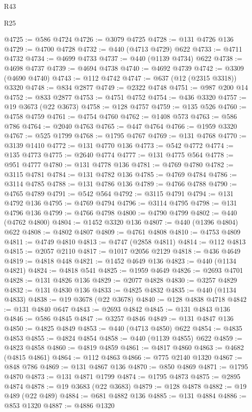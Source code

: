 \begin{lexlean}{R43}
\begin{lexlean}{R25}
\begin{coremodule}
{{{{{{{{{{{{{{{{{{{{{{{{{{{{{{{{{{{{{{{{{{{{{{{{{{{{{{{{{{{{{{{{{{{{{{{{{{{{{{{{{{{{{{{{{{{{{{{{{{{{{{{{{{{{{{{{{{{{{{{{{{{{{{{{{{{{{{{{{{{{{{{{{{{{{{{{{{{{{{{{{{{{{{{{{{{{{{{{{{{{{{{{{{{{{{{{{@4725 := @586 @4724
@4726 := @3079 @4725
@4728 := @131 @4726 @136
@4729 := @4700 @4728
@4732 := @440 (@4713 @4729) @622
@4733 := @4711 @4732
@4734 := @4699 @4733
@4737 := @440 (@1139 @4734) @622
@4738 := @4698 @4737
@4739 := @4694 @4738
@4740 := @4692 @4739
@4742 := @3309 (@4690 @4740)
@4743 := @112 @4742
@4747 := @637 (@12 (@2315 @3318)) @3320
@4748 := @834 @2877
@4749 := @2322 @4748
@4751 := @987 @200 @14
@4752 := @833 @2877
@4753 := @4751 @4752
@4754 := @436 @3320
@4757 := @19 @3673 (@22 @3673)
@4758 := @128 @4757
@4759 := @135 @526
@4760 := @4758 @4759
@4761 := @4754 @4760
@4762 := @1408 @573
@4763 := @586 @786
@4764 := @2040 @4763
@4765 := @447 @4764
@4766 := @1959 @3320
@4767 := @525 @1799
@4768 := @1795 @4767
@4769 := @131 @4768
@4770 := @3139 @1410
@4772 := @131 @4770 @136
@4773 := @542 @4772
@4774 := @135 @4773
@4775 := @2640 @4774
@4777 := @131 @4775 @564
@4778 := @951 @4777
@4780 := @131 @4778 @136
@4781 := @4769 @4780
@4782 := @3115 @4781
@4784 := @131 @4782 @136
@4785 := @4769 @4784
@4786 := @3114 @4785
@4788 := @131 @4786 @136
@4789 := @4766 @4788
@4790 := @4765 @4789
@4791 := @542 @564
@4792 := @3115 @4791
@4794 := @131 @4792 @136
@4795 := @4769 @4794
@4796 := @3114 @4795
@4798 := @131 @4796 @136
@4799 := @4766 @4798
@4800 := @4790 @4799
@4802 := @440 (@4762 @4800)
@4804 := @1452 @3320 @136
@4807 := @440 (@1396 @4804) @622
@4808 := @4802 @4807
@4809 := @4761 @4808
@4810 := @4753 @4809
@4811 := @4749 @4810
@4813 := @4747 (@2858 @4811)
@4814 := @112 @4813
@4815 := @2057 @2110
@4817 := @1017 @2056 @2129
@4818 := @436 @4649
@4819 := @4818 @448
@4821 := @1452 @4649 @136
@4823 := @440 (@1134 @4821)
@4824 := @4818 @541
@4825 := @1959 @4649
@4826 := @2693 @4701
@4828 := @131 @4826 @136
@4829 := @2077 @4828
@4830 := @3257 @4829
@4832 := @131 @4830 @136
@4833 := @4825 @4832
@4835 := @440 (@1134 @4833)
@4838 := @19 @3678 (@22 @3678)
@4840 := @128 @4838 @4718
@4842 := @131 @4840 @647
@4843 := @2693 @4842
@4845 := @131 @4843 @136
@4846 := @586 @4845
@4847 := @3257 @4846
@4849 := @131 @4847 @136
@4850 := @4825 @4849
@4853 := @440 (@4713 @4850) @622
@4854 := @4835 @4853
@4855 := @4824 @4854
@4858 := @440 (@1139 @4855) @622
@4859 := @4823 @4858
@4860 := @4819 @4859
@4861 := @4817 @4860
@4863 := @4682 (@4815 @4861)
@4864 := @112 @4863
@4866 := @775 @2140 @1320
@4867 := @848 @786
@4869 := @131 @4867 @136
@4870 := @850 @4869
@4871 := @1795 @4870
@4873 := @131 @4871 @1799
@4874 := @1795 @4873
@4875 := @2895 @4874
@4878 := @19 @3683 (@22 @3683)
@4879 := @128 @4878
@4882 := @19 @489 (@22 @489)
@4884 := @681 @4882 @136
@4885 := @131 @4884
@4886 := @853 @1320
@4887 := @4886 @1320
}}}}}}}}}}}}}}}}}}}}}}}}}}}}}}}}}}}}}}}}}}}}}}}}}}}}}}}}}}}}}}}}}}}}}}}}}}}}}}}}}}}}}}}}}}}}}}}}}}}}}}}}}}}}}}}}}}}}}}}}}}}}}}}}}}}}}}}}}}}}}}}}}}}}}}}}}}}}}}}}}}}}}}}}}}}}}}}}}}}}}}}}}}}}}}}}}
\end{coremodule}
\end{lexlean}
\end{lexlean}
